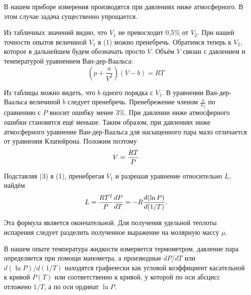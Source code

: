\documentclass[12pt,a4paper]{article}
\begin{document}
В нашем приборе измерения производятся при давлениях ниже атмосферного. 
В этом случае задача существенно упрощается.

Из табличных значений видно, что $V_1$ не превосходит 0,5\% от $V_2$. 
При нашей точности опытов величиной  $V_1$ в (1) можно пренебречь.
Обратимся теперь к $V_2$, которое в дальнейшем будем обозначать просто $V$. Объём $V$ связан с давлением и температурой уравнением Ван-дер-Ваальса:
\begin{equation}
    \left(p + \frac{a}{V^2}\right)\left(V - b\right) = RT
\end{equation}

Из таблицы можно видеть, что $b$ одного порядка с $V_1$. 
В уравнении Ван-дер-Ваальса величиной $b$ следует пренебречь. 
Пренебрежение членом $\frac a {V_2}$ по сравнению с $P$ вносит ошибку менее 3\%. 
При давлении ниже атмосферного ошибки становятся ещё меньше. 
Таким образом, при давлениях ниже атмосферного уравнение Ван-дер-Ваальса для насыщенного пара мало отличается от уравнения Клапейрона. 
Положим поэтому
\begin{equation}
    V = {RT \over P}
\end{equation}

Подставляя (3) в (1), пренебрегая $V_1$ и разрешая уравнение относительно $L$, найдём
\begin{equation}
    L = {RT^2 \over P} {dP \over dT} = -R {d(\ln P) \over d(1/T)}.
\end{equation}

Эта формула является окончательной. 
Для получения удельной теплоты испарения следует разделить полученное выражение на молярную массу $\mu$.

В нашем опыте температура жидкости измеряется термометром, давление пара определяется при помощи манометра, а производные $dP/dT$ или $d(\ln P)/d(1/T)$ находятся графически как угловой коэффициент касательной к кривой $P(T)$ или соответственно к кривой, у которой по оси абсцисс отложено $1/T$, а по оси ординат $\ln P$.
\end{document}
